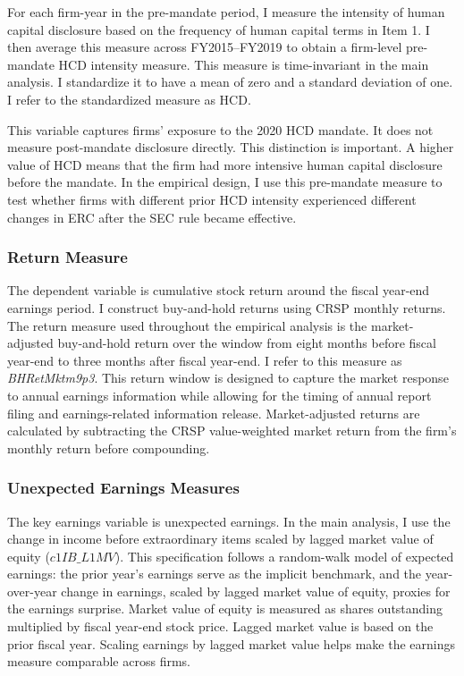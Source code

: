\documentclass[12pt]{article}
\begin{document}
For each firm-year in the pre-mandate period, I measure the intensity of human capital disclosure based on the frequency of human capital terms in Item 1. I then average this measure across FY2015--FY2019 to obtain a firm-level pre-mandate HCD intensity measure. This measure is time-invariant in the main analysis. I standardize it to have a mean of zero and a standard deviation of one. I refer to the standardized measure as HCD.

This variable captures firms' exposure to the 2020 HCD mandate. It does not measure post-mandate disclosure directly. This distinction is important. A higher value of HCD means that the firm had more intensive human capital disclosure before the mandate. In the empirical design, I use this pre-mandate measure to test whether firms with different prior HCD intensity experienced different changes in ERC after the SEC rule became effective.

\subsubsection{Return Measure}

The dependent variable is cumulative stock return around the fiscal year-end earnings period. I construct buy-and-hold returns using CRSP monthly returns. The return measure used throughout the empirical analysis is the market-adjusted buy-and-hold return over the window from eight months before fiscal year-end to three months after fiscal year-end. I refer to this measure as \textit{BHRetMktm9p3}. This return window is designed to capture the market response to annual earnings information while allowing for the timing of annual report filing and earnings-related information release. Market-adjusted returns are calculated by subtracting the CRSP value-weighted market return from the firm's monthly return before compounding. 

\subsubsection{Unexpected Earnings Measures}

The key earnings variable is unexpected earnings. In the main analysis, I use the change in income before extraordinary items scaled by lagged market value of equity ($c1IB\_L1MV$). This specification follows a random-walk model of expected earnings: the prior year's earnings serve as the implicit benchmark, and the year-over-year change in earnings, scaled by lagged market value of equity, proxies for the earnings surprise. Market value of equity is measured as shares outstanding multiplied by fiscal year-end stock price. Lagged market value is based on the prior fiscal year. Scaling earnings by lagged market value helps make the earnings measure comparable across firms.
\end{document}
